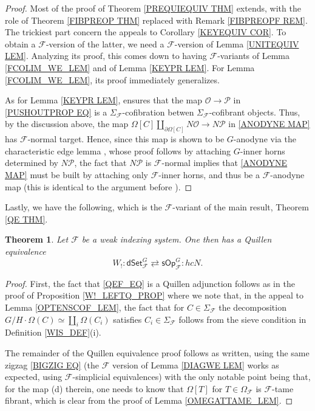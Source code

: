 \documentclass[a4paper,10pt
,draft
]{article}%
\numberwithin{equation}{section}
\numberwithin{figure}{section}
\newtheorem{theorem}[equation]{Theorem}%
\theoremstyle{definition} %
\newcommand{\sOp}{\ensuremath{\mathsf{sOp}}}%
\newcommand{\dSet}{\mathsf{dSet}}
\newcommand{\F}{\ensuremath{\mathcal F}}
\renewcommand{\O}{\ensuremath{\mathcal O}}
\renewcommand{\P}{\ensuremath{\mathcal P}}
\newcommand{\1}{\ensuremath{\mathbbm 1}}%
\begin{document}
\begin{proof}
	Most of the proof of Theorem \ref{PREQUIEQUIV THM}
	extends, with the role of  
	Theorem \ref{FIBPREOP THM} 
	replaced with
	Remark \ref{FIBPREOPF REM}.
	The trickiest part concern the appeals 
	to Corollary \ref{KEYEQUIV COR}.
	To obtain a $\F$-version of the latter, 
	we need a $\F$-version of Lemma \ref{UNITEQUIV LEM}.
	Analyzing its proof, 
	this comes down to having $\F$-variants of 
	Lemma \ref{FCOLIM_WE_LEM} and of Lemma \ref{KEYPR LEM}.
	For Lemma \ref{FCOLIM_WE_LEM}, its proof immediately generalizes.
	
	As for Lemma \ref{KEYPR LEM},
	\cite[Prop. \ref{OC-SIGMAG_COF PROP}]{BP_FCOP}
	ensures that the map $\O \to \P$ in \eqref{PUSHOUTPROP EQ}
	is a $\Sigma_\F$-cofibration betwen $\Sigma_\F$-cofibrant objects.
	Thus, by the discussion above,
	the map
	$\Omega[C]\amalg_{\partial \Omega[C]} N \O \to N\P$ in
	\eqref{ANODYNE MAP} has $\F$-normal target. 
	Hence, since this map is shown to be $G$-anodyne via the characteristic edge lemma \cite[Lemma 3.4]{BP_edss},
	whose proof follows by attaching $G$-inner horns determined by $N\P$,
	the fact that $N\P$ is $\F$-normal implies that 
	\eqref{ANODYNE MAP} must be built by attaching only 
	$\F$-inner horns, and thus be a $\F$-anodyne map
	(this is identical to the argument before  
	\cite[Thm. 6.7]{BP_edss}).
\end{proof}



Lastly, we have the following, which is the 
$\F$-variant of the main result, Theorem \ref{QE THM}.


\begin{theorem}\label{QEF THM}
	Let $\F$ be a weak indexing system.
	One then has a Quillen equivalence
	\begin{equation}
	\label{QEF_EQ}
	W_! \colon 
	\dSet^G_{\F} \rightleftarrows \sOp^G_{\F}
	\colon hcN.
	\end{equation}
\end{theorem}


\begin{proof}
	First, the fact that \eqref{QEF_EQ} is a Quillen adjunction
	follows as in the proof of Proposition \ref{W!_LEFTQ_PROP}
	where we note that, in the appeal to 
	Lemma \ref{OPTENSCOF_LEM},
	the fact that for $C \in \Sigma_\F$ the decomposition
	$G/H \cdot \Omega(C) \simeq \amalg_i \Omega(C_i)$
	satisfies $C_i \in \Sigma_\F$ 
	follows from the sieve condition in Definition \ref{WIS_DEF}(i).

	The remainder of the Quillen equivalence proof follows as written,
	using the same zigzag \eqref{BIGZIG EQ}
	(the $\F$ version of Lemma \ref{DIAGWE LEM}
	works as expected, using $\F$-simplicial equivalences)
	with the only notable point being that, for the map (d) therein,
	one needs to know that 
	$\Omega[T]$ for $T\in \Omega_\F$
	is $\F$-tame fibrant, which is clear from the proof of
	Lemma \ref{OMEGATTAME_LEM}.
\end{proof}
\end{document}

